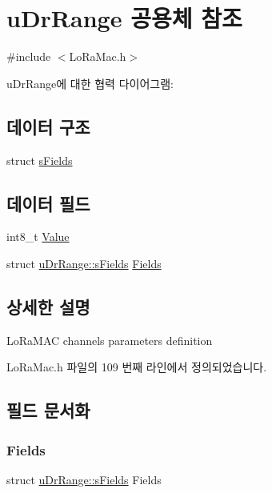 \hypertarget{unionu_dr_range}{}\section{u\+Dr\+Range 공용체 참조}
\label{unionu_dr_range}


{\ttfamily \#include $<$Lo\+Ra\+Mac.\+h$>$}



u\+Dr\+Range에 대한 협력 다이어그램\+:
\subsection*{데이터 구조}
\begin{DoxyCompactItemize}
\item 
struct \mbox{\hyperlink{structu_dr_range_1_1s_fields}{s\+Fields}}
\end{DoxyCompactItemize}
\subsection*{데이터 필드}
\begin{DoxyCompactItemize}
\item 
int8\+\_\+t \mbox{\hyperlink{unionu_dr_range_ae1e3e8696366e3256e397bbdc4e34775}{Value}}
\item 
struct \mbox{\hyperlink{structu_dr_range_1_1s_fields}{u\+Dr\+Range\+::s\+Fields}} \mbox{\hyperlink{unionu_dr_range_a5bdb9afc17112f2ae5f9548f0aee964f}{Fields}}
\end{DoxyCompactItemize}


\subsection{상세한 설명}
Lo\+Ra\+M\+AC channels parameters definition 

Lo\+Ra\+Mac.\+h 파일의 109 번째 라인에서 정의되었습니다.



\subsection{필드 문서화}
\mbox{\label{unionu_dr_range_a5bdb9afc17112f2ae5f9548f0aee964f}} 
\subsubsection{\texorpdfstring{Fields}{Fields}}
{\footnotesize\ttfamily struct \mbox{\hyperlink{structu_dr_range_1_1s_fields}{u\+Dr\+Range\+::s\+Fields}} Fields}

